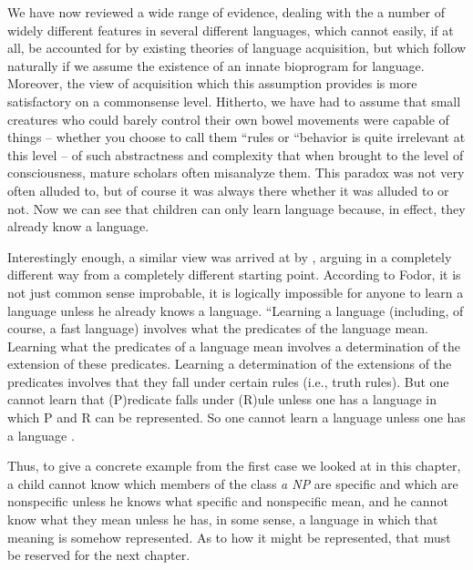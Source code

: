 We have now reviewed a wide range of evidence, dealing with the
 a number of widely different features in several different languages, which cannot easily, if at all, be accounted for by existing theories of language acquisition, but which follow naturally if we assume the existence of an innate bioprogram for language. Moreover, the view of acquisition which this assumption provides is more satis\-factory on a commonsense level. Hitherto, we have had to assume that small creatures who could barely control their own bowel move\-ments were capable of  things -- whether you choose to call them ``rules or ``behavior is quite irrelevant at this level -- of such abstractness and complexity that when brought to the level of consciousness, mature scholars often misanalyze them. This paradox was not very often alluded to, but of course it was always there whether it was alluded to or not. Now we can see that children can only learn language because, in effect, they already know a language.

Interestingly enough, a similar view was arrived at by \citet{Fodor1975}, arguing in a completely different way from a completely different starting point. According to Fodor, it is not just common sense improbable, it is logically impossible for anyone to learn a lan\-guage unless he already knows a language. ``Learning a language (including, of course, a fast language) involves  what the predicates of the language mean. Learning what the predicates of a language mean involves  a determination of the extension of these predicates. Learning a determination of the extensions of the predicates involves  that they fall under certain rules (i.e., truth rules). But one cannot learn that (P)redicate falls under (R)ule unless one has a lan\-guage in which P and R can be represented. So one cannot learn a language unless one has a language \citep[63--64]{Fodor1975}.

Thus, to give a concrete example from the first case we looked at in this chapter, a child cannot know which members of the class \textit{a NP} are specific and which are nonspecific unless he knows what specific and nonspecific mean, and he cannot know what they mean unless he has, in some sense, a language in which that meaning is some\-how represented. As to how it might be represented, that must be reserved for the next chapter.


